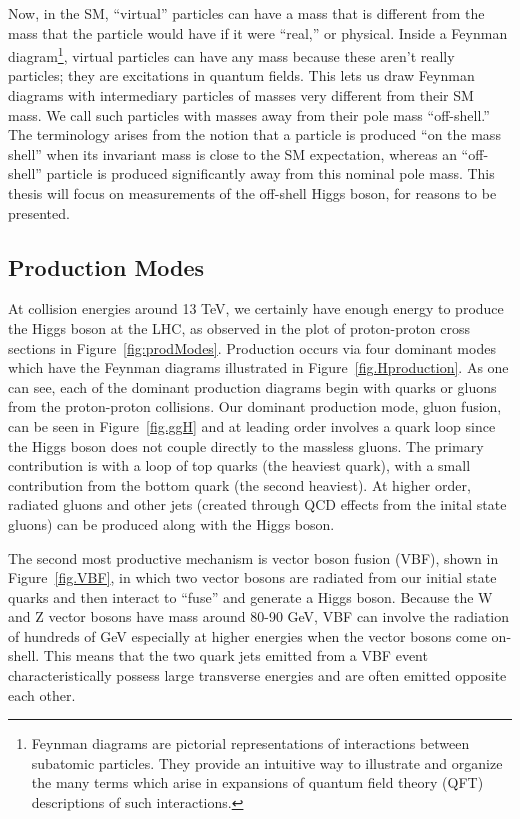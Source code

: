 
Now, in the SM, ``virtual'' particles can have a mass that is different from the mass that the
particle would have if it were ``real,'' or physical. Inside a Feynman diagram\footnote{Feynman diagrams are pictorial representations of interactions between subatomic particles. They provide an intuitive way to illustrate and organize the many terms which arise in expansions of quantum field theory (QFT) descriptions of such interactions.}, virtual particles can have any mass because these aren’t really particles; they are excitations in quantum fields.
This lets us draw Feynman diagrams with intermediary particles of masses very different from their SM mass. 
We call such particles with masses away from their pole mass ``off-shell.''  The terminology arises from the notion that a particle is produced ``on the mass shell'' when its invariant mass is close to the SM expectation, whereas an ``off-shell'' particle is produced significantly away from this nominal pole mass. This thesis will focus on measurements of the off-shell Higgs boson, for reasons to be presented. 

\subsection{Production Modes}

At collision energies around 13 TeV, we certainly have enough energy to produce the Higgs boson at the LHC, as observed in the plot of proton-proton cross sections in Figure~\ref{fig:prodModes}. Production occurs via four dominant modes which have the Feynman diagrams illustrated in Figure~\ref{fig.Hproduction}. As one can see, each of the dominant production diagrams begin with quarks or gluons from the proton-proton collisions. Our dominant production mode, gluon fusion, can be seen in Figure~\ref{fig.ggH} and at leading order involves a quark loop since the Higgs boson does not couple directly to the massless gluons. The primary contribution is with a loop of top quarks (the heaviest quark), with a small contribution from the bottom quark (the second heaviest). At higher order, radiated gluons and other jets (created through QCD effects from the inital state gluons) can be produced along with the Higgs boson. 

The second most productive mechanism is vector boson fusion (VBF), shown in Figure~\ref{fig.VBF}, in which two vector bosons are radiated from our initial state quarks and then interact to ``fuse'' and generate a Higgs boson. Because the W and Z vector bosons have mass around 80-90 GeV, VBF can involve the radiation of hundreds of GeV especially at higher energies when the vector bosons come on-shell. This means that the two quark jets emitted from a VBF event characteristically possess large transverse energies and are often emitted opposite each other. 

